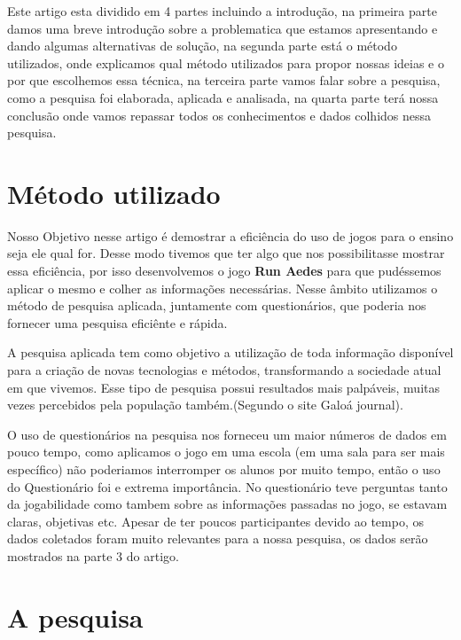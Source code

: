 \documentclass[12pt]{article}
\begin{document}
	Este artigo esta dividido em 4 partes incluindo a introdução, na primeira parte damos uma breve introdução sobre a problematica que estamos apresentando e dando algumas alternativas de solução, na segunda parte está o método utilizados, onde explicamos qual método utilizados para propor nossas ideias e o por que escolhemos essa técnica, na terceira parte vamos falar sobre a pesquisa, como a pesquisa foi elaborada, aplicada e analisada, na quarta parte terá nossa conclusão onde vamos repassar todos os conhecimentos e dados colhidos nessa pesquisa.
	
		
		
	\section{Método utilizado}%
		Nosso Objetivo nesse artigo é demostrar a eficiência do uso de jogos para o ensino seja ele qual for. Desse modo  tivemos que ter algo que nos possibilitasse mostrar essa eficiência, por isso desenvolvemos o jogo \textbf{Run Aedes} para que pudéssemos aplicar o mesmo e colher as informações necessárias. Nesse âmbito utilizamos o método de pesquisa aplicada, juntamente com questionários, que poderia nos fornecer uma pesquisa eficiênte e rápida.
		
		A pesquisa aplicada tem como objetivo a utilização de toda informação disponível para a criação de novas tecnologias e métodos, transformando a sociedade atual em que vivemos. Esse tipo de pesquisa possui resultados mais palpáveis, muitas vezes percebidos pela população também.(Segundo o site Galoá journal).
		
		O uso de questionários na pesquisa nos forneceu um maior números de dados em pouco tempo, como aplicamos o jogo em uma escola (em uma sala para ser mais específico) não poderiamos interromper os alunos por muito tempo, então o uso do Questionário foi e extrema importância. No questionário teve perguntas tanto da jogabilidade como tambem sobre as informações passadas no jogo, se estavam claras, objetivas etc. Apesar de ter poucos participantes devido ao tempo, os dados coletados foram muito relevantes para a nossa pesquisa, os dados serão mostrados na parte 3 do artigo.
	
	
	
	\section{A pesquisa} %
	
\end{document}
